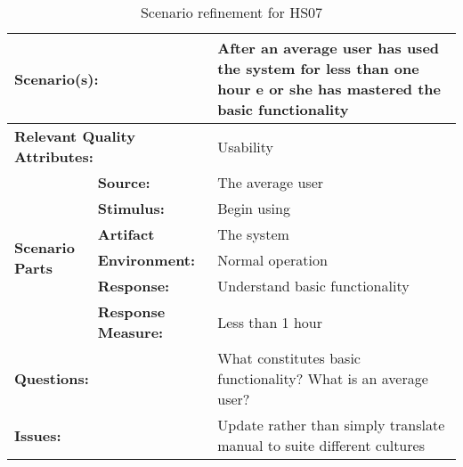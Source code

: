 \documentclass[10pt,a4paper]{article}
\begin{document}
\begin{table}[!htp]
\begin{center}
\begin{tabular}{|p{0.3cm}|p{2.5cm}|p{8cm}|}
  \hline
  \multicolumn{2}{|p{3cm}|}{\bfseries Scenario(s):} & After an average user has used the system for less than one hour e or she has mastered the basic functionality \\
  \hline
  \multicolumn{2}{|p{3cm}|}{\bfseries Relevant Quality Attributes:} & Usability \\
  \hline
  \multirow{6}{*}{\begin{sideways}{\bfseries Scenario Parts}\end{sideways}}
  & {\bfseries Source:} & The average user \\
  \cline{2-3}
  & {\bfseries Stimulus:} & Begin using \\
  \cline{2-3}
  & {\bfseries Artifact} & The system \\
  \cline{2-3}
  & {\bfseries Environment:} & Normal operation \\
  \cline{2-3}
  & {\bfseries Response:} & Understand basic functionality \\
  \cline{2-3}
  & {\bfseries Response Measure:} & Less than 1 hour \\
  \hline
  \multicolumn{2}{|p{3cm}|}{\bfseries Questions:} & What constitutes basic functionality? What is an average user? \\
  \hline
  \multicolumn{2}{|p{3cm}|}{\bfseries Issues:} & Update rather than simply translate manual to suite different cultures \\
  \hline
\end{tabular}
\caption{Scenario refinement for HS07}
\end{center}
\end{table}
\end{document}
